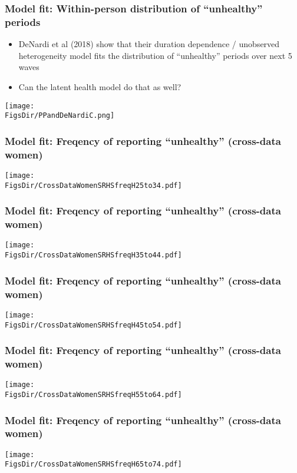 \documentclass[aspectratio=169]{beamer}
\newcommand{\FigsDir}{../Figures}
\begin{document}
\begin{frame}\frametitle{Model fit: Within-person distribution of ``unhealthy'' periods}
\begin{itemize}
\item DeNardi et al (2018) show that their duration dependence / unobserved heterogeneity model fits the distribution of ``unhealthy'' periods over next 5 waves

\item Can the latent health model do that as well?
\end{itemize}
\begin{center}
	\texttt{[image: \\FigsDir/PPandDeNardiC.png]}
\end{center}
\end{frame}


\begin{frame}\frametitle{Model fit: Freqency of reporting ``unhealthy'' (cross-data women)}
\begin{center}
	\texttt{[image: \\FigsDir/CrossDataWomenSRHSfreqH25to34.pdf]}
\end{center}
\end{frame}

\begin{frame}\frametitle{Model fit: Freqency of reporting ``unhealthy'' (cross-data women)}
\begin{center}
	\texttt{[image: \\FigsDir/CrossDataWomenSRHSfreqH35to44.pdf]}
\end{center}
\end{frame}

\begin{frame}\frametitle{Model fit: Freqency of reporting ``unhealthy'' (cross-data women)}
\begin{center}
	\texttt{[image: \\FigsDir/CrossDataWomenSRHSfreqH45to54.pdf]}
\end{center}
\end{frame}

\begin{frame}\frametitle{Model fit: Freqency of reporting ``unhealthy'' (cross-data women)}
\begin{center}
	\texttt{[image: \\FigsDir/CrossDataWomenSRHSfreqH55to64.pdf]}
\end{center}
\end{frame}

\begin{frame}\frametitle{Model fit: Freqency of reporting ``unhealthy'' (cross-data women)}
\begin{center}
	\texttt{[image: \\FigsDir/CrossDataWomenSRHSfreqH65to74.pdf]}
\end{center}
\end{frame}
\end{document}
